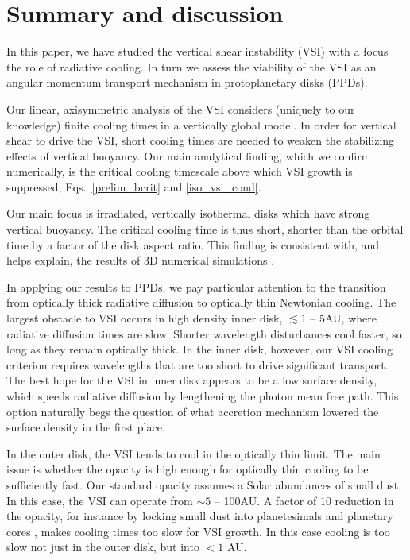 \section{Summary and discussion}\label{summary}
In this paper, we have studied the vertical shear instability (VSI) with a focus the 
role of radiative cooling.  In turn we assess the viability of the VSI 
as an angular momentum transport mechanism in protoplanetary disks (PPDs).

Our linear, axisymmetric analysis of the VSI 
considers (uniquely to our knowledge) finite cooling times in a vertically global model.  
In order for vertical shear to drive the VSI, short cooling times are needed to weaken 
the stabilizing effects of vertical buoyancy. Our main analytical finding, which we confirm numerically, 
is the critical cooling  timescale above which VSI growth is suppressed, Eqs.\ \ref{prelim_bcrit} and \ref{iso_vsi_cond}.


Our main focus is irradiated, vertically isothermal disks which have strong vertical buoyancy.
The critical cooling time is thus short, shorter than the orbital time by a factor of the disk
aspect ratio.  This finding is consistent with, and helps explain, the results of 3D numerical simulations .

In applying our results to PPDs, we pay particular attention to the transition from 
optically thick radiative diffusion to optically thin Newtonian cooling.  The largest obstacle to VSI occurs in 
high density inner disk, $\lesssim 1$ -- 5AU, where radiative diffusion times are slow.  Shorter wavelength disturbances
 cool faster, so long as they remain optically thick.  In the inner disk, however, our VSI cooling criterion requires 
 wavelengths that are too short to drive significant transport.  The best hope for the VSI in inner disk appears to 
 be a low surface density, which speeds radiative diffusion by lengthening the photon mean free path.  This option naturally begs 
 the question of what accretion mechanism lowered the surface density in the first place. 
 
 In the outer disk, the VSI tends to cool in the optically thin limit.  The main issue is whether the opacity 
 is high enough for optically thin cooling to be sufficiently fast.  Our standard opacity assumes a Solar abundances of small dust.
 In this case, the VSI can operate from $\sim 5$ -- 100AU.  
A factor of 10 reduction in the opacity, for instance by locking
 small dust into planetesimals and planetary cores \citep{youdin13}, makes cooling times too slow for VSI growth.  
 In this case cooling is too slow not just in the outer disk, but into  $< 1$ AU.
 
